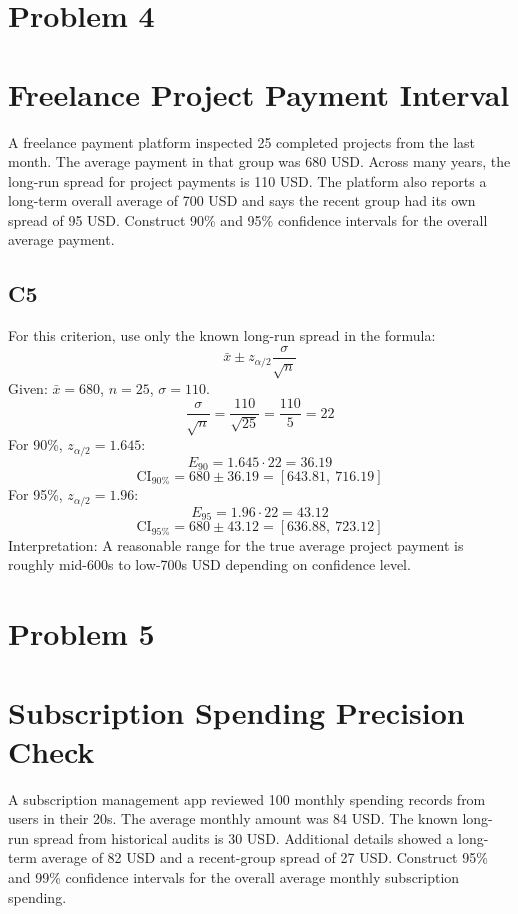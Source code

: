 \begin{ExamProblems}
		\newpage
		\item
		\section{Problem 4}
		\section{Freelance Project Payment Interval}
		A freelance payment platform inspected 25 completed projects from the last month.
		The average payment in that group was 680 USD.
		Across many years, the long-run spread for project payments is 110 USD.
		The platform also reports a long-term overall average of 700 USD and says the recent group had its own spread of 95 USD.
		Construct 90\% and 95\% confidence intervals for the overall average payment.

		\subsection*{C5}
		For this criterion, use only the known long-run spread in the formula:
		\[
		\bar{x} \pm z_{\alpha/2}\frac{\sigma}{\sqrt{n}}
		\]
		Given: $\bar{x}=680$, $n=25$, $\sigma=110$.
		\[
		\frac{\sigma}{\sqrt{n}}=\frac{110}{\sqrt{25}}=\frac{110}{5}=22
		\]
		For 90\%, $z_{\alpha/2}=1.645$:
		\[
		E_{90}=1.645\cdot 22=36.19
		\]
		\[
		\text{CI}_{90\%}=680\pm 36.19=[643.81,\ 716.19]
		\]
		For 95\%, $z_{\alpha/2}=1.96$:
		\[
		E_{95}=1.96\cdot 22=43.12
		\]
		\[
		\text{CI}_{95\%}=680\pm 43.12=[636.88,\ 723.12]
		\]
		Interpretation: A reasonable range for the true average project payment is roughly mid-600s to low-700s USD depending on confidence level.

		\newpage
		\item
		\section{Problem 5}
		\section{Subscription Spending Precision Check}
		A subscription management app reviewed 100 monthly spending records from users in their 20s.
		The average monthly amount was 84 USD.
		The known long-run spread from historical audits is 30 USD.
		Additional details showed a long-term average of 82 USD and a recent-group spread of 27 USD.
		Construct 95\% and 99\% confidence intervals for the overall average monthly subscription spending.


\end{ExamProblems}

